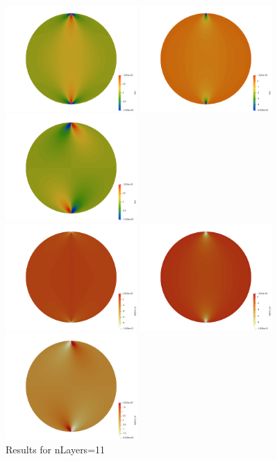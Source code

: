 \begin{center}
\includegraphics[width=5cm]{python_codes/fieldstone_58/experiment1/111/exx}
\includegraphics[width=5cm]{python_codes/fieldstone_58/experiment1/111/eyy}
\includegraphics[width=5cm]{python_codes/fieldstone_58/experiment1/111/exy}\\
\includegraphics[width=5cm]{python_codes/fieldstone_58/experiment1/111/sigma_xx}
\includegraphics[width=5cm]{python_codes/fieldstone_58/experiment1/111/sigma_yy}
\includegraphics[width=5cm]{python_codes/fieldstone_58/experiment1/111/sigma_xy}\\
{\captionfont Results for nLayers=11}
\end{center}

